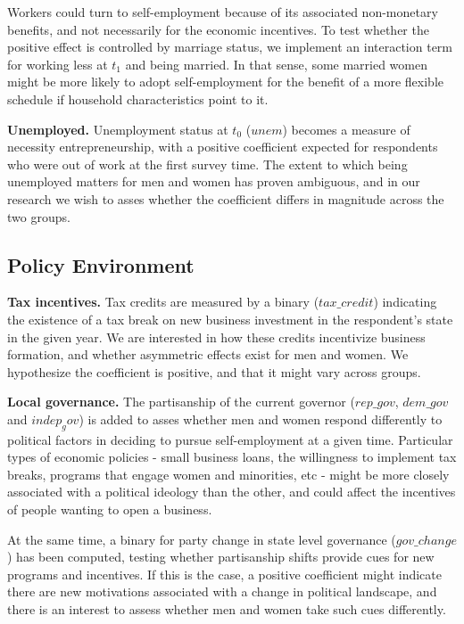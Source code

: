 Workers could turn to self-employment because of its associated non-monetary benefits, and not necessarily for the economic incentives. To test whether the positive effect is controlled by marriage status, we implement an interaction term for working less at $t_1$ and being married. In that sense, some married women might be more likely to adopt self-employment for the benefit of a more flexible schedule if household characteristics point to it. 

\textbf{Unemployed.} Unemployment status at $t_0$ ($unem$) becomes a measure of necessity entrepreneurship, with a positive coefficient expected for respondents who were out of work at the first survey time. The extent to which being unemployed matters for men and women has proven ambiguous, and in our research we wish to asses whether the coefficient differs in magnitude across the two groups.


\subsection{Policy Environment}

\textbf{Tax incentives.} Tax credits are measured by a binary ($tax\_credit$) indicating the existence of a tax break on new business investment in the respondent's state in the given year. We are interested in how these credits incentivize business formation, and whether asymmetric effects exist for men and women. We hypothesize the coefficient is positive, and that it might vary across groups.

\textbf{Local governance.} The partisanship of the current governor ($rep\_gov$, $dem\_gov$ and $indep_gov$) is added to asses whether men and women respond differently to political factors in deciding to pursue self-employment at a given time. Particular types of economic policies - small business loans, the willingness to implement tax breaks, programs that engage women and minorities, etc - might be more closely associated with a political ideology than the other, and could affect the incentives of people wanting to open a business. 

At the same time, a binary for party change in state level governance ($gov\_change$) has been computed, testing whether partisanship shifts provide cues for new programs and incentives. If this is the case, a positive coefficient might indicate there are new motivations associated with a change in political landscape, and there is an interest to assess whether men and women take such cues differently. 


